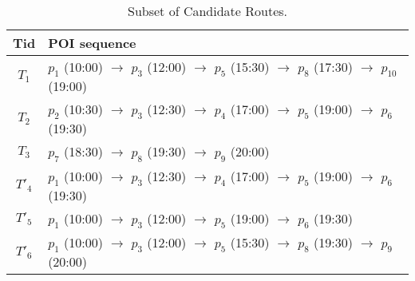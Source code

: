 \vspace{-2mm}

 \begin{table}[h]
 \centering
 \caption{Subset of Candidate Routes.}
 \begin{footnotesize}
 \begin{tabular}{|c|l|} \hline
 Tid & POI sequence\\ \hline
 $T_{1}$ & $p_{1}$ (10:00) $\rightarrow$ $p_{3}$ (12:00) $\rightarrow$ $p_{5}$ (15:30) $\rightarrow$ $p_{8}$ (17:30) $\rightarrow$ $p_{10}$(19:00)\\ \hline
 $T_{2}$ & $p_{2}$ (10:30) $\rightarrow$ $p_{3}$ (12:30) $\rightarrow$ $p_{4}$ (17:00) $\rightarrow$ $p_{5}$ (19:00) $\rightarrow$ $p_{6}$ (19:30)\\ \hline
 $T_{3}$ & $p_{7}$ (18:30) $\rightarrow$ $p_{8}$ (19:30) $\rightarrow$ $p_{9}$ (20:00) \\ \hline
 $T'_{4}$ & $p_{1}$ (10:00) $\rightarrow$ $p_{3}$ (12:30) $\rightarrow$ $p_{4}$ (17:00) $\rightarrow$ $p_{5}$ (19:00) $\rightarrow$ $p_{6}$ (19:30)\\ \hline
 $T'_{5}$ & $p_{1}$ (10:00) $\rightarrow$ $p_{3}$ (12:00) $\rightarrow$ $p_{5}$ (19:00) $\rightarrow$ $p_{6}$ (19:30)\\ \hline
 $T'_{6}$ & $p_{1}$ (10:00) $\rightarrow$ $p_{3}$ (12:00) $\rightarrow$ $p_{5}$ (15:30) $\rightarrow$ $p_{8}$ (19:30) $\rightarrow$ $p_{9}$ (20:00)\\ \hline
 \end{tabular}
 \end{footnotesize}
 \label{Tab:re_trj}
 \end{table}


